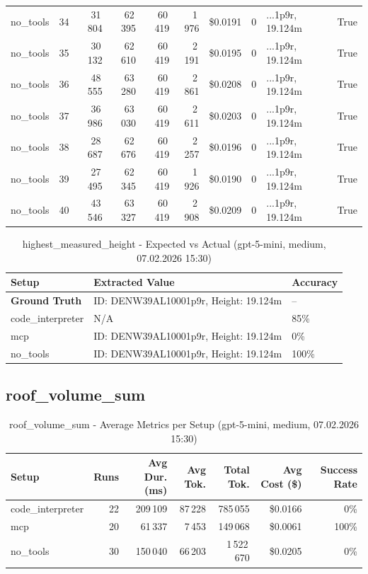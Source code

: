 \documentclass[a4paper,11pt]{article}
\begin{document}
\begin{table}[H]
{\begin{tabular}{l r r r r r r r l r}
no\_tools & 34 & 31\,804 & 62\,395 & 60\,419 & 1\,976 & \$0.0191 & 0 & ...1p9r, 19.124m & True \\
no\_tools & 35 & 30\,132 & 62\,610 & 60\,419 & 2\,191 & \$0.0195 & 0 & ...1p9r, 19.124m & True \\
no\_tools & 36 & 48\,555 & 63\,280 & 60\,419 & 2\,861 & \$0.0208 & 0 & ...1p9r, 19.124m & True \\
no\_tools & 37 & 36\,986 & 63\,030 & 60\,419 & 2\,611 & \$0.0203 & 0 & ...1p9r, 19.124m & True \\
no\_tools & 38 & 28\,687 & 62\,676 & 60\,419 & 2\,257 & \$0.0196 & 0 & ...1p9r, 19.124m & True \\
no\_tools & 39 & 27\,495 & 62\,345 & 60\,419 & 1\,926 & \$0.0190 & 0 & ...1p9r, 19.124m & True \\
no\_tools & 40 & 43\,546 & 63\,327 & 60\,419 & 2\,908 & \$0.0209 & 0 & ...1p9r, 19.124m & True \\
\bottomrule
\end{tabular}}
\end{table}

\begin{table}[H]
\centering
\scriptsize
\caption{highest\_measured\_height - Expected vs Actual (gpt-5-mini, medium, 07.02.2026 15:30)}
\begin{tabular}{l l l}
\toprule
Setup & Extracted Value & Accuracy \\
\midrule
\textbf{Ground Truth} & ID: DENW39AL10001p9r, Height: 19.124m & -- \\
\midrule
code\_interpreter & N/A & 85\% \\
mcp & ID: DENW39AL10001p9r, Height: 19.124m & 0\% \\
no\_tools & ID: DENW39AL10001p9r, Height: 19.124m & 100\% \\
\bottomrule
\end{tabular}
\end{table}

\clearpage

\subsection{roof\_volume\_sum}

\begin{table}[H]
\centering
\scriptsize
\caption{roof\_volume\_sum - Average Metrics per Setup (gpt-5-mini, medium, 07.02.2026 15:30)}
\label{tab:combined\_roof\_volume\_sum\_metrics\_20260207}
\begin{tabular}{l r r r r r r}
\toprule
Setup & Runs & Avg Dur. (ms) & Avg Tok. & Total Tok. & Avg Cost (\$) & Success Rate \\
\midrule
code\_interpreter & 22 & 209\,109 & 87\,228 & 785\,055 & \$0.0166 & 0\% \\
mcp & 20 & 61\,337 & 7\,453 & 149\,068 & \$0.0061 & 100\% \\
no\_tools & 30 & 150\,040 & 66\,203 & 1\,522\,670 & \$0.0205 & 0\% \\
\bottomrule
\end{tabular}
\end{table}
\end{document}

